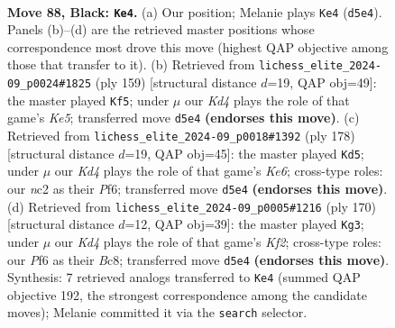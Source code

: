 \documentclass[11pt]{article}
\begin{document}
\clearpage

\begin{figure}[p]\centering
\begin{subfigure}{0.46\textwidth}\centering
\resizebox{\linewidth}{!}{%
\newchessgame
\chessboard[
  setfen={8/3r2p1/5p2/1R1k3p/7P/6P1/2N5/7K b - - 1 88},
  showmover=false,
  pgfstyle=straightmove, color=movearrow, markmove={d5-e4}
]}
\caption{}
\end{subfigure}\hfill
\begin{subfigure}{0.46\textwidth}\centering
\resizebox{\linewidth}{!}{%
\newchessgame
\chessboard[
  setfen={8/4R3/8/1p4p1/1r2k3/7P/2K4P/8 b - - 3 80},
  showmover=false,
  pgfstyle=straightmove, color=movearrow, markmove={e4-f5}
]}
\caption{}
\end{subfigure}
\\[4pt]
\begin{subfigure}{0.46\textwidth}\centering
\resizebox{\linewidth}{!}{%
\newchessgame
\chessboard[
  setfen={5k2/p7/4KP2/2P5/p7/4r3/1P4R1/8 w - - 1 90},
  showmover=false,
  pgfstyle=straightmove, color=movearrow, markmove={e6-d5}
]}
\caption{}
\end{subfigure}\hfill
\begin{subfigure}{0.46\textwidth}\centering
\resizebox{\linewidth}{!}{%
\newchessgame
\chessboard[
  setfen={2B5/5R2/3k2p1/6Pp/7P/8/1r3K2/8 w - - 1 86},
  showmover=false,
  pgfstyle=straightmove, color=movearrow, markmove={f2-g3}
]}
\caption{}
\end{subfigure}
\caption{\textbf{Move 88, Black: \texttt{Ke4}.} (a) Our position; Melanie plays \texttt{Ke4} (\texttt{d5e4}). Panels (b)--(d) are the retrieved master positions whose correspondence most drove this move (highest QAP objective among those that transfer to it). (b) Retrieved from \texttt{lichess\_elite\_2024-09\_p0024\#1825} (ply 159) [structural distance $d$=19, QAP obj=49]: the master played \texttt{Kf5}; under $\mu$ our \emph{Kd4} plays the role of that game's \emph{Ke5}; transferred move \texttt{d5e4} \textbf{(endorses this move)}. (c) Retrieved from \texttt{lichess\_elite\_2024-09\_p0018\#1392} (ply 178) [structural distance $d$=19, QAP obj=45]: the master played \texttt{Kd5}; under $\mu$ our \emph{Kd4} plays the role of that game's \emph{Ke6}; cross-type roles: our \emph{n}c2 as their \emph{P}f6; transferred move \texttt{d5e4} \textbf{(endorses this move)}. (d) Retrieved from \texttt{lichess\_elite\_2024-09\_p0005\#1216} (ply 170) [structural distance $d$=12, QAP obj=39]: the master played \texttt{Kg3}; under $\mu$ our \emph{Kd4} plays the role of that game's \emph{Kf2}; cross-type roles: our \emph{P}f6 as their \emph{B}c8; transferred move \texttt{d5e4} \textbf{(endorses this move)}. Synthesis: 7 retrieved analogs transferred to \texttt{Ke4} (summed QAP objective 192, the strongest correspondence among the candidate moves); Melanie committed it via the \texttt{search} selector.}
\label{fig:thought-m175}
\end{figure}
\end{document}
